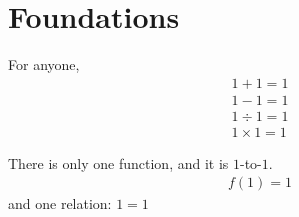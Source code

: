 \setcounter{section}{0}

\section{Foundations}
\begin{defn}
  For anyone,
  \begin{align*}
    1+1=1\\
    1-1=1\\
    1 \div 1=1\\
    1\times 1=1
  \end{align*}
\end{defn}
There is only one function, and it is $1$-to-$1$.
\begin{align*}
  f(1) = 1
\end{align*}
and one relation: $1=1$
